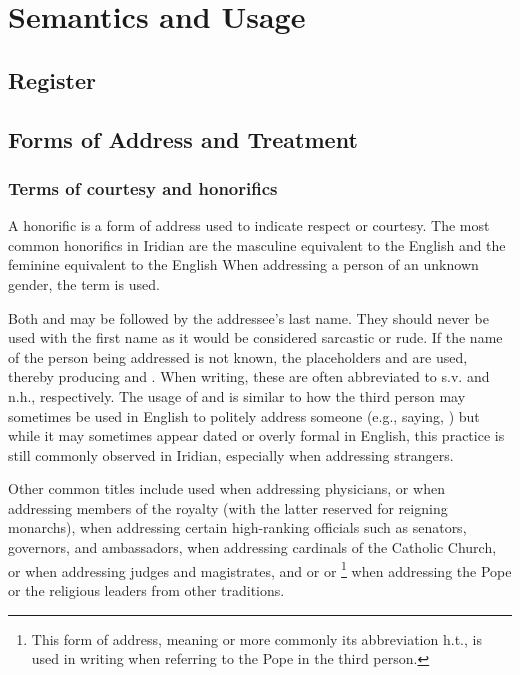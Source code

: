 \chapter{Semantics and Usage}

\section{Register}
\section{Forms of Address and Treatment}

\subsection{Terms of courtesy and honorifics}

A {\sc honorific} is a form of address used to indicate respect or courtesy. The most common honorifics in
Iridian are the masculine  equivalent to the English  and the feminine
 equivalent to the English  When addressing a person of an unknown
gender, the term  is used.

Both  and  may be followed by the addressee's last name. They should never be used with
the first name as it would be considered sarcastic or rude. If the name of the person being addressed is not
known, the placeholders  and  are used, thereby producing 
and . When writing, these are often abbreviated to {\sc s.v.} and {\sc n.h.}, respectively.
The usage of  and  is similar to how the third person may sometimes be used
in English to politely address someone (e.g., saying, ) but while
it may sometimes appear dated or overly formal in English, this practice is still commonly observed
in Iridian, especially when addressing strangers.

Other common titles include  used when addressing physicians,  or 
when addressing members of the royalty (with the latter reserved for reigning monarchs),  when
addressing certain high-ranking officials such as senators, governors, and ambassadors,  when addressing
cardinals of the Catholic Church,  or  when addressing judges and magistrates, and
 or  or \footnote{This form of address, meaning
 or more commonly its abbreviation {\sc h.t.}, is used in writing when referring to the Pope in the
third person.} when addressing the Pope or the religious leaders from other traditions.


